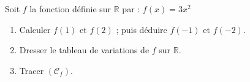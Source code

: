 \begin{Application}[][10 min]
Soit $f$ la fonction définie sur $\mathbb{R}$ par : $f(x) = 3x^2$
\begin{enumerate}
    \item Calculer $f(1)$ et $f(2)$ ; puis déduire $f(-1)$ et $f(-2)$.
    \item Dresser le tableau de variations de $f$ sur $\mathbb{R}$.
    \item Tracer $(\mathcal{C}_f)$.
\end{enumerate}
\end{Application}
